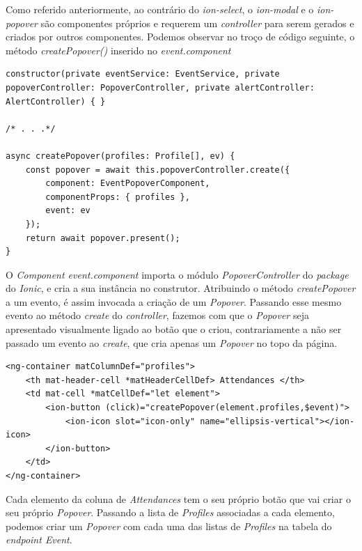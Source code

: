Como referido anteriormente, ao contrário do \textit{ion-select}, o \textit{ion-modal} e o \textit{ion-popover} são componentes próprios e requerem um \textit{controller} para serem gerados e criados por outros componentes. Podemos observar no troço de código seguinte, o método \textit{createPopover()} inserido no \textit{event.component}

\begin{lstlisting}
constructor(private eventService: EventService, private popoverController: PopoverController, private alertController: AlertController) { }

/* . . .*/

async createPopover(profiles: Profile[], ev) {
	const popover = await this.popoverController.create({
		component: EventPopoverComponent,
		componentProps: { profiles },
		event: ev
	});
	return await popover.present();
}
\end{lstlisting}



O \textit{Component event.component} importa o módulo \textit{PopoverController} do \textit{package} do \textit{Ionic}, e cria a sua instância no construtor. Atribuindo o método \textit{createPopover} a um evento, é assim invocada a criação de um \textit{Popover}. Passando esse mesmo evento ao método \textit{create} do \textit{controller}, fazemos com que o \textit{Popover} seja apresentado visualmente ligado ao botão que o criou, contrariamente a não ser passado um evento ao \textit{create}, que cria apenas um \textit{Popover} no topo da página.\\

\begin{lstlisting}
<ng-container matColumnDef="profiles">
	<th mat-header-cell *matHeaderCellDef> Attendances </th>
	<td mat-cell *matCellDef="let element">
		<ion-button (click)="createPopover(element.profiles,$event)">
			<ion-icon slot="icon-only" name="ellipsis-vertical"></ion-icon>
		</ion-button>
	</td>
</ng-container>
\end{lstlisting}



Cada elemento da coluna de \textit{Attendances} tem o seu próprio botão que vai criar o seu próprio \textit{Popover}. Passando a lista de \textit{Profiles} associadas a cada elemento, podemos criar um \textit{Popover} com cada uma das listas de \textit{Profiles} na tabela do \textit{endpoint Event}.\\

